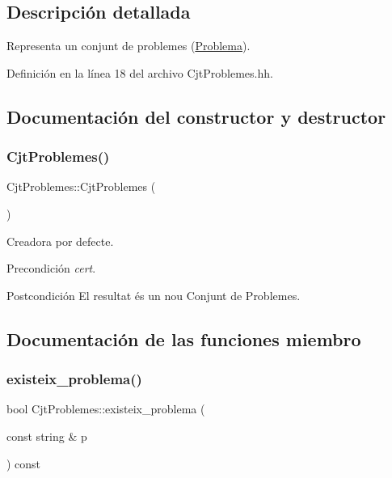 \subsection{Descripción detallada}
Representa un conjunt de problemes (\mbox{\hyperlink{class_problema}{Problema}}). 

Definición en la línea 18 del archivo Cjt\+Problemes.\+hh.



\subsection{Documentación del constructor y destructor}
\mbox{\label{class_cjt_problemes_ae6f76d8e493e80bba4fc28a124826cb5}} 
\subsubsection{\texorpdfstring{Cjt\+Problemes()}{CjtProblemes()}}
{\footnotesize\ttfamily Cjt\+Problemes\+::\+Cjt\+Problemes (\begin{DoxyParamCaption}{ }\end{DoxyParamCaption})}



Creadora por defecte. 

\begin{DoxyPrecond}{Precondición}
{\itshape cert}. 
\end{DoxyPrecond}
\begin{DoxyPostcond}{Postcondición}
El resultat és un nou Conjunt de Problemes. 
\end{DoxyPostcond}


\subsection{Documentación de las funciones miembro}
\mbox{\label{class_cjt_problemes_a27f5be292f79fd47915093fb84013e67}} 
\subsubsection{\texorpdfstring{existeix\+\_\+problema()}{existeix\_problema()}}
{\footnotesize\ttfamily bool Cjt\+Problemes\+::existeix\+\_\+problema (\begin{DoxyParamCaption}\item[{const string \&}]{p }\end{DoxyParamCaption}) const}



